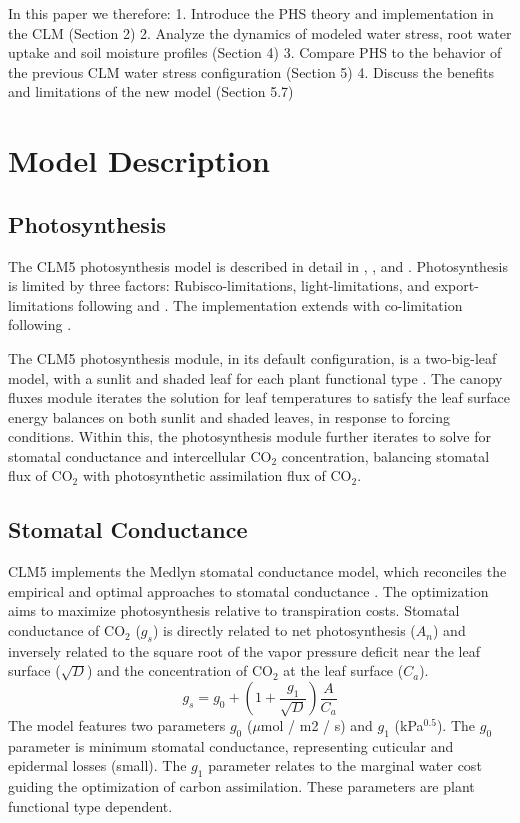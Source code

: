 \documentclass[draft,linenumbers]{agujournal}
\begin{document}
In this paper we therefore:
1. Introduce the PHS theory and implementation in the CLM (Section 2)
2. Analyze the dynamics of modeled water stress, root water uptake and soil moisture profiles (Section 4)
3. Compare PHS to the behavior of the previous CLM water stress configuration (Section 5)
4. Discuss the benefits and limitations of the new model (Section 5.7)


\section{Model Description}

\subsection{Photosynthesis}
\label{sect:A}
    The CLM5 photosynthesis model is described in detail in \citet{bonan2011}, \citet{thornton2007},
    and \citet{oleson2013}. Photosynthesis is limited by three factors: Rubisco-limitations, light-limitations, and export-limitations 
    following \citet{farquhar1980} and \citet{harley1992}. The implementation extends \citet{sellers1996a,sellers1996b} with 
    co-limitation following \citet{collatz1991}. 
    
    The CLM5 photosynthesis module, in its default configuration, is a two-big-leaf model, with a sunlit and shaded leaf for each plant functional type \citep{thornton2007, dai2004, oleson2013}. 
    The canopy fluxes module iterates the solution for leaf temperatures to satisfy the leaf surface energy balances on both sunlit and shaded leaves, in response to forcing conditions.
    Within this, the photosynthesis module further iterates to solve for stomatal conductance and intercellular CO$_2$ concentration, balancing stomatal flux of CO$_2$ with photosynthetic assimilation flux of CO$_2$.

\subsection{Stomatal Conductance}
\label{sect:gs}
    CLM5 implements the Medlyn stomatal conductance model, which reconciles the empirical and optimal approaches to 
    stomatal conductance \citep{medlyn2011}.
    The optimization aims to maximize photosynthesis relative to transpiration costs. 
    Stomatal conductance of CO$_2$ ($g_s$) is directly related to net photosynthesis ($A_n$) 
    and inversely related to the square root of the vapor pressure deficit near the leaf surface ($\sqrt{D}$) and the concentration of CO$_2$ at the leaf surface ($C_a$).
    \begin{equation}
    g_s=g_0+\left(1+\dfrac{g_1}{\sqrt{D}}\right)\dfrac{A}{C_a}
    \end{equation}
    The model features two parameters $g_0$ ($\mu$mol / m2 / s) and $g_1$ (kPa$^{0.5}$). 
    The $g_0$ parameter is minimum stomatal conductance, representing cuticular and epidermal losses (small). 
    The $g_1$ parameter relates to the marginal water cost guiding the optimization of carbon assimilation. 
    These parameters are plant functional type dependent.
    
\end{document}
